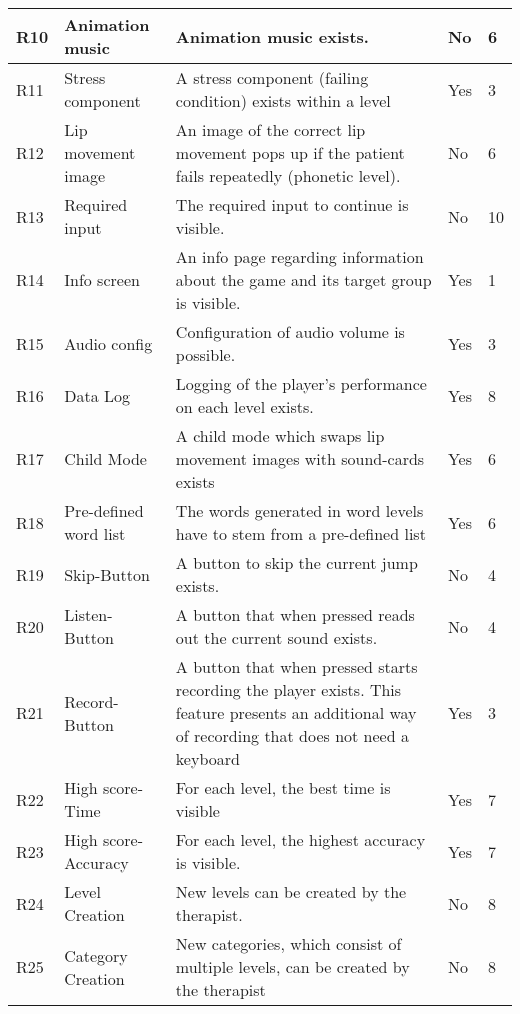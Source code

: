 \documentclass[draft,final]{vutinfth} %
\begin{document}
\begin{longtable}[h]{|p{}|p{}|p{}|p{}|p{}|}
R10 & Animation music &  Animation music exists. & No & 6 \\ \hline
R11 & Stress component &  A stress component (failing condition) exists within a level & Yes & 3 \\ \hline
R12 & Lip movement image &  An image of the correct lip movement pops up if the patient fails repeatedly (phonetic level). & No & 6 \\ \hline
R13 & Required input &  The required input to continue is visible. & No & 10 \\ \hline
R14 & Info screen &  An info page regarding information about the game and its target group is visible. & Yes & 1 \\ \hline
R15 & Audio config &  Configuration of audio volume is possible. & Yes & 3 \\ \hline
R16 & Data Log &  Logging of the player's performance on each level exists. & Yes & 8 \\ \hline
R17 & Child Mode &  A child mode which swaps lip movement images with sound-cards exists & Yes & 6 \\ \hline
R18 & Pre-defined word list &  The words generated in word levels have to stem from a pre-defined list & Yes & 6 \\ \hline
R19 & Skip-Button &  A button to skip the current jump exists. & No & 4 \\ \hline
R20 & Listen-Button &  A button that when pressed reads out the current sound exists. & No & 4 \\ \hline
R21 & Record-Button &  A button that when pressed starts recording the player exists. This feature presents an additional way of recording that does not need a keyboard & Yes & 3 \\ \hline
R22 & High score-Time & For each level, the best time is visible & Yes & 7 \\ \hline
R23 & High score-Accuracy &  For each level, the highest accuracy is  visible. & Yes & 7 \\ \hline
R24 & Level Creation &  New levels can be created by the therapist. & No & 8 \\ \hline
R25 & Category Creation & New categories, which consist of multiple levels, can be created by the therapist & No & 8 \\ \hline

\end{longtable}
\end{document}
